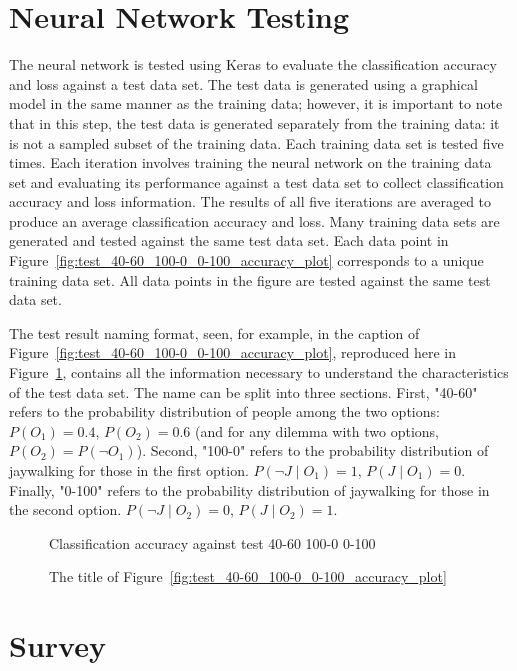 \documentclass[]{report}
\begin{document}
\FloatBarrier
\section{Neural Network Testing}

The neural network is tested using Keras to evaluate the classification accuracy and loss against a
test data set. The test data is generated using a graphical model in the same manner as the training
data; however, it is important to note that in this step, the test data is generated separately from
the training data: it is not a sampled subset of the training data. Each training data set is tested
five times. Each iteration involves training the neural network on the training data set and
evaluating its performance against a test data set to collect classification accuracy and loss
information. The results of all five iterations are averaged to produce an average classification
accuracy and loss. Many training data sets are generated and tested against the same test data set.
Each data point in Figure~\ref{fig:test_40-60_100-0_0-100_accuracy_plot} corresponds to a unique
training data set. All data points in the figure are tested against the same test data set.

The test result naming format, seen, for example, in the caption of
Figure~\ref{fig:test_40-60_100-0_0-100_accuracy_plot}, reproduced here in
Figure~\ref{fig:test_result_naming_example}, contains all the information necessary to understand
the characteristics of the test data set. The name can be split into three sections. First, "40-60"
refers to the probability distribution of people among the two options: $P(O_1) = 0.4$, $P(O_2) =
0.6$ (and for any dilemma with two options, $P(O_2) = P(\neg O_1)$). Second, "100-0" refers to the
probability distribution of jaywalking for those in the first option. $P(\neg J \mid O_1) = 1$, $P(J
\mid O_1) = 0$. Finally, "0-100" refers to the probability distribution of jaywalking for those in
the second option. $P(\neg J \mid O_2) = 0$, $P(J \mid O_2) = 1$.

\begin{figure}[h]
    \centering
    Classification accuracy against test 40-60 100-0 0-100
    \caption{The title of Figure~\ref{fig:test_40-60_100-0_0-100_accuracy_plot}}
    \label{fig:test_result_naming_example}
\end{figure}

\FloatBarrier
\section{Survey}
\end{document}
